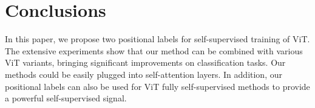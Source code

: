 \documentclass{article}
\begin{document}
\section{Conclusions}

In this paper, we propose two positional labels for self-supervised training of ViT. The extensive experiments show that our method can be combined with various ViT variants, bringing significant improvements on classification tasks. Our methods could be easily plugged into self-attention layers. In addition, our positional labels can also be used for ViT fully self-supervised methods to provide a powerful self-supervised signal.




\end{document}
